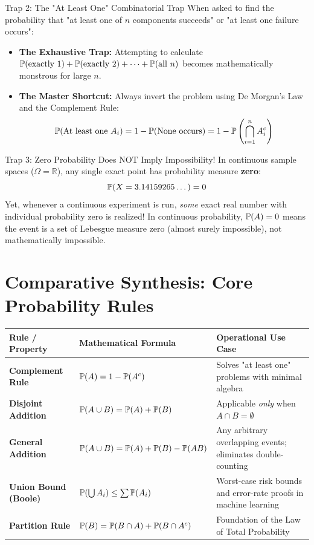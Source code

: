 \begin{trapbox}{Trap 2: The "At Least One" Combinatorial Trap}
When asked to find the probability that "at least one of $n$ components succeeds" or "at least one failure occurs":
\begin{itemize}
    \item \textbf{The Exhaustive Trap:} Attempting to calculate $\P(\text{exactly 1}) + \P(\text{exactly 2}) + \dots + \P(\text{all } n)$ becomes mathematically monstrous for large $n$.
    \item \textbf{The Master Shortcut:} Always invert the problem using De Morgan's Law and the Complement Rule:
    $$\P(\text{At least one } A_i) = 1 - \P(\text{None occurs}) = 1 - \P\left(\bigcap_{i=1}^n A_i^c\right)$$
\end{itemize}
\end{trapbox}

\begin{trapbox}{Trap 3: Zero Probability Does NOT Imply Impossibility!}
In continuous sample spaces ($\Omega = \mathbb{R}$), any single exact point has probability measure \textbf{zero}:
$$\P(X = 3.14159265\dots) = 0$$
Yet, whenever a continuous experiment is run, \emph{some} exact real number with individual probability zero is realized! In continuous probability, $\P(A) = 0$ means the event is a set of Lebesgue measure zero (almost surely impossible), not mathematically impossible.
\end{trapbox}

\section{Comparative Synthesis: Core Probability Rules}

\begin{center}
\renewcommand{\arraystretch}{1.3}
\begin{tabular}{p{3.5cm}p{4.2cm}p{4.8cm}}
\toprule
\textbf{Rule / Property} & \textbf{Mathematical Formula} & \textbf{Operational Use Case} \\
\midrule
\textbf{Complement Rule} & $\P(A) = 1 - \P(A^c)$ & Solves "at least one" problems with minimal algebra \\
\textbf{Disjoint Addition} & $\P(A \cup B) = \P(A) + \P(B)$ & Applicable \emph{only} when $A \cap B = \emptyset$ \\
\textbf{General Addition} & $\P(A \cup B) = \P(A) + \P(B) - \P(AB)$ & Any arbitrary overlapping events; eliminates double-counting \\
\textbf{Union Bound (Boole)} & $\P(\bigcup A_i) \le \sum \P(A_i)$ & Worst-case risk bounds and error-rate proofs in machine learning \\
\textbf{Partition Rule} & $\P(B) = \P(B \cap A) + \P(B \cap A^c)$ & Foundation of the Law of Total Probability \\
\bottomrule
\end{tabular}
\end{center}

